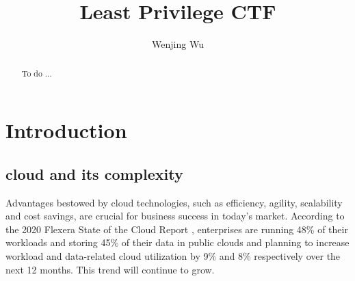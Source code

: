 \documentclass[sigconf]{acmart}
\begin{document}
\title{Least Privilege CTF}

\author{Wenjing Wu}



\renewcommand{\shortauthors}{Trovato and Tobin, et al.}

\begin{abstract}
 To do ...
\end{abstract}





\maketitle

\section{Introduction}
\subsection{cloud and its complexity}
Advantages bestowed by cloud technologies, such as efficiency, agility, scalability and cost savings, are crucial for business success in today’s market. According to the 2020 Flexera State of the Cloud Report \cite{Flexera2020}, enterprises are running 48\% of their workloads and storing 45\% of their data in public clouds and planning to increase workload and data-related cloud utilization by 9\% and 8\% respectively over the next 12 months. This trend will continue to grow.
\end{document}
